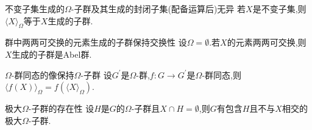 \begin{corollary}{不变子集生成的$\Omega$-子群及其生成的封闭子集(配备运算后)无异}{}
	若$X$是不变子集,则$\langle X\rangle_{\Omega}$等于$X$生成的子群.
\end{corollary}

\begin{corollary}{群中两两可交换的元素生成的子群保持交换性}{}
	设$\Omega=\emptyset$.若$X$的元素两两可交换,则$X$生成的子群是Abel群.
\end{corollary}

\begin{corollary}{$\Omega$-群同态的像保持$\Omega$-子群}{}
	设$G^{\prime}$是$\Omega$-群,$f:G\to G^{\prime}$是$\Omega$-群同态,则$\langle f\left(X\right)\rangle_{\Omega}=f\left(\langle X\rangle_{\Omega}\right)$.
\end{corollary}

\begin{theorem}{极大$\Omega$-子群的存在性}{}
	设$H$是$G$的$\Omega$-子群且$X\cap H=\emptyset$,则$G$有包含$H$且不与$X$相交的极大$\Omega$-子群.
\end{theorem}






































